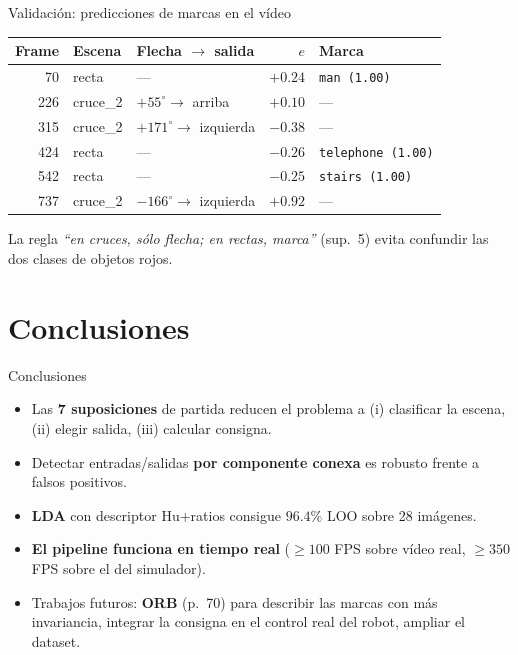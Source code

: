 \begin{frame}{Validación: predicciones de marcas en el vídeo}
\centering\small
\begin{tabular}{rllrl}
\hline
\textbf{Frame} & \textbf{Escena} & \textbf{Flecha $\to$ salida} & \textbf{$e$} & \textbf{Marca}\\\hline
70   & recta    & ---           & $+0.24$ & \texttt{man (1.00)}\\
226  & cruce\_2 & $+55^{\circ}\to$ arriba    & $+0.10$ & ---\\
315  & cruce\_2 & $+171^{\circ}\to$ izquierda & $-0.38$ & ---\\
424  & recta    & ---           & $-0.26$ & \texttt{telephone (1.00)}\\
542  & recta    & ---           & $-0.25$ & \texttt{stairs (1.00)}\\
737  & cruce\_2 & $-166^{\circ}\to$ izquierda & $+0.92$ & ---\\\hline
\end{tabular}

\medskip
La regla \emph{``en cruces, sólo flecha; en rectas, marca''} (sup.~5) evita confundir las dos clases de objetos rojos.
\end{frame}


\section{Conclusiones}

\begin{frame}{Conclusiones}
\begin{itemize}
  \item Las \textbf{7 suposiciones} de partida reducen el problema a (i) clasificar la escena, (ii) elegir salida, (iii) calcular consigna.
  \item Detectar entradas/salidas \textbf{por componente conexa} es robusto frente a falsos positivos.
  \item \textbf{LDA} con descriptor Hu+ratios consigue $96.4\%$ LOO sobre 28 imágenes.
  \item \textbf{El pipeline funciona en tiempo real} ($\geq 100$ FPS sobre vídeo real, $\geq 350$ FPS sobre el del simulador).
  \item Trabajos futuros: \textbf{ORB} (p.~70) para describir las marcas con más invariancia, integrar la consigna en el control real del robot, ampliar el dataset.
\end{itemize}
\end{frame}

